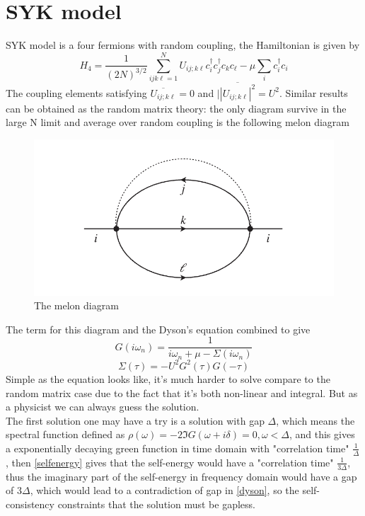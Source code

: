 \documentclass[10pt,openany]{book}
\theoremstyle{thmstyle} %
\theoremstyle{defstyle} %
\theoremstyle{prostyle} %
\begin{document}
\section{SYK model}
SYK model is a four fermions with random coupling, the Hamiltonian is given by
\begin{equation}
  H_4=\frac{1}{(2 N)^{3 / 2}} \sum_{i j k \ell=1}^N U_{i j ; k \ell} c_i^{\dagger} c_j^{\dagger} c_k c_{\ell}-\mu \sum_i c_i^{\dagger} c_i
\end{equation}
\indent The coupling elements satisfying $ \overline{U_{i j ; k \ell}}=0 $ and $ \mid \overline{\left|U_{i j ; k \ell}\right|^2}=U^2 $. Similar results can be obtained as the random matrix theory: the only diagram survive in the large N limit and average over random coupling is the following melon diagram
\begin{figure}[!h]
  \centering
  \includegraphics*[scale = 0.5]{Figures/melon.png}
  \caption{The melon diagram}
  \label{melon}
\end{figure}
\indent The term for this diagram and the Dyson's equation combined to give
\begin{equation}
  G\left(i \omega_n\right)=\frac{1}{i \omega_n+\mu-\Sigma\left(i \omega_n\right)}
  \label{dyson}
\end{equation}
\begin{equation}
  \Sigma(\tau)=-U^2 G^2(\tau) G(-\tau)
  \label{selfenergy}
\end{equation}
\indent Simple as the equation looks like, it's much harder to solve compare to the random matrix case due to the fact that it's both non-linear and integral. But as a physicist we can always guess the solution.\\
\indent The first solution one may have a try is a solution with gap $ \Delta $, which means the spectral function defined as $ \rho(\omega) = -2\Im G(\omega+i\delta) = 0, \omega<\Delta$, and this gives a exponentially decaying green function in time domain with "correlation time" $ \frac{1}{\Delta} $, then \eqref{selfenergy} gives that the self-energy would have a "correlation time" $ \frac{1}{3\Delta} $, thus the imaginary part of the self-energy in frequency domain would have a gap of $ 3\Delta $, which would lead to a contradiction of gap in \eqref{dyson}, so the self-consistency constraints that the solution must be gapless.
\end{document}
